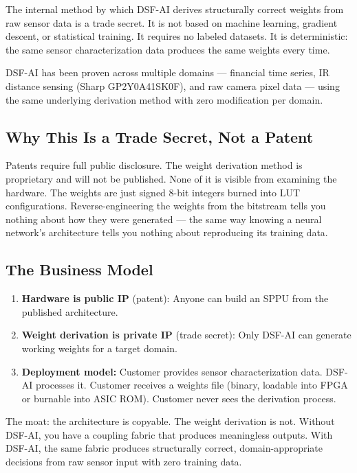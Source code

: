 \documentclass[11pt,a4paper]{article}
\begin{document}
The internal method by which DSF-AI derives structurally correct weights from raw sensor data is a trade secret. It is not based on machine learning, gradient descent, or statistical training. It requires no labeled datasets. It is deterministic: the same sensor characterization data produces the same weights every time.

DSF-AI has been proven across multiple domains --- financial time series, IR distance sensing (Sharp GP2Y0A41SK0F), and raw camera pixel data --- using the same underlying derivation method with zero modification per domain.

\subsection{Why This Is a Trade Secret, Not a Patent}

Patents require full public disclosure. The weight derivation method is proprietary and will not be published. None of it is visible from examining the hardware. The weights are just signed 8-bit integers burned into LUT configurations. Reverse-engineering the weights from the bitstream tells you nothing about how they were generated --- the same way knowing a neural network's architecture tells you nothing about reproducing its training data.

\subsection{The Business Model}

\begin{enumerate}
    \item \textbf{Hardware is public IP} (patent): Anyone can build an SPPU from the published architecture.
    \item \textbf{Weight derivation is private IP} (trade secret): Only DSF-AI can generate working weights for a target domain.
    \item \textbf{Deployment model:} Customer provides sensor characterization data. DSF-AI processes it. Customer receives a weights file (binary, loadable into FPGA or burnable into ASIC ROM). Customer never sees the derivation process.
\end{enumerate}

The moat: the architecture is copyable. The weight derivation is not. Without DSF-AI, you have a coupling fabric that produces meaningless outputs. With DSF-AI, the same fabric produces structurally correct, domain-appropriate decisions from raw sensor input with zero training data.
\end{document}
